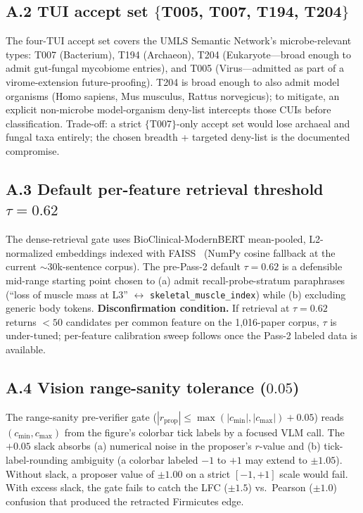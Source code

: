 \documentclass[10pt,twocolumn,letterpaper]{article}
\begin{document}
\subsection*{A.2 TUI accept set $\{$T005, T007, T194, T204$\}$}
\label{app:tui}
\noindent The four-TUI accept set covers the UMLS Semantic Network's
microbe-relevant types: T007 (Bacterium), T194 (Archaeon), T204
(Eukaryote---broad enough to admit gut-fungal mycobiome entries), and T005
(Virus---admitted as part of a virome-extension future-proofing). T204 is
broad enough to also admit model organisms (Homo sapiens, Mus musculus,
Rattus norvegicus); to mitigate, an explicit non-microbe model-organism
deny-list intercepts those CUIs before classification. Trade-off: a strict
$\{$T007$\}$-only accept set would lose archaeal and fungal taxa entirely;
the chosen breadth + targeted deny-list is the documented compromise.

\subsection*{A.3 Default per-feature retrieval threshold $\tau = 0.62$}
\noindent The dense-retrieval gate uses BioClinical-ModernBERT
mean-pooled, L2-normalized embeddings indexed with
FAISS~\cite{johnson2019faiss} (NumPy cosine fallback at the current
$\sim$30k-sentence corpus). The pre-Pass-2 default $\tau = 0.62$ is a
defensible mid-range starting point chosen to (a) admit
recall-probe-stratum paraphrases (``loss of muscle mass at L3''
$\leftrightarrow$ \texttt{skeletal\_muscle\_index}) while (b) excluding
generic body tokens.
\textbf{Disconfirmation condition.} If retrieval at $\tau{=}0.62$ returns
$<50$ candidates per common feature on the 1{,}016-paper corpus, $\tau$ is
under-tuned; per-feature calibration sweep follows once the Pass-2 labeled
data is available.

\subsection*{A.4 Vision range-sanity tolerance ($0.05$)}
\noindent The range-sanity pre-verifier gate
($|r_{\text{prop}}| \leq \max(|c_{\min}|, |c_{\max}|) + 0.05$) reads
$(c_{\min}, c_{\max})$ from the figure's colorbar tick labels by a focused
VLM call. The $+0.05$ slack absorbs (a) numerical noise in the proposer's
$r$-value and (b) tick-label-rounding ambiguity (a colorbar labeled $-1$ to
$+1$ may extend to $\pm 1.05$). Without slack, a proposer value of
$\pm 1.00$ on a strict $[-1, +1]$ scale would fail. With excess slack, the
gate fails to catch the LFC ($\pm 1.5$) vs.\ Pearson ($\pm 1.0$) confusion
that produced the retracted Firmicutes edge.
\end{document}
